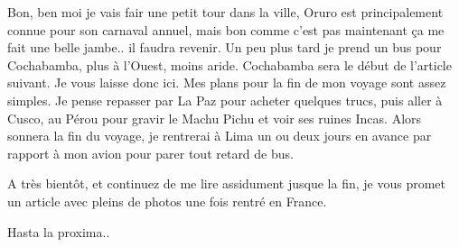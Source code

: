 \begin{multicols}{2}
Bon, ben moi je vais fair une petit tour dans la ville, Oruro est principalement connue pour son carnaval annuel, mais bon comme c'est pas maintenant ça me fait une belle jambe.. il faudra revenir. Un peu plus tard je prend un bus pour Cochabamba, plus à l'Ouest, moins aride. Cochabamba sera le début de l'article suivant. Je vous laisse donc ici. Mes plans pour la fin de mon voyage sont assez simples. Je pense repasser par La Paz pour acheter quelques trucs, puis aller à Cusco, au Pérou pour gravir le Machu Pichu et voir ses ruines Incas. Alors sonnera la fin du voyage, je rentrerai à Lima un ou deux jours en avance par rapport à mon avion pour parer tout retard de bus.

A très bientôt, et continuez de me lire assidument jusque la fin, je vous promet un article avec pleins de photos une fois rentré en France.

Hasta la proxima..

\end{multicols}


